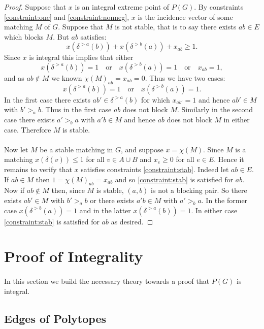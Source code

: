 \begin{proof}
Suppose that $x$ is an integral extreme point of $P(G)$. By constraints \ref{constraint:one} and \ref{constraint:nonneg}, $x$ is the incidence vector of some matching $M$ of $G$. Suppose that $M$ is not stable, that is to say there exists $ab \in E$ which blocks $M$. But $ab$ satisfies:
$$x(\delta^{>a}(b)) + x(\delta^{>b}(a)) + x_{ab} \geq 1.$$
Since $x$ is integral this implies that either
$$x(\delta^{>a}(b)) = 1 \quad\text{or}\quad  x(\delta^{>b}(a)) = 1 \quad\text{or}\quad x_{ab}=1,$$
and as $ab \not\in M$ we known $\chi(M)_{ab} = x_{ab}=0$. Thus we have two cases:
$$x(\delta^{>a}(b)) = 1 \quad\text{or}\quad  x(\delta^{>b}(a)) = 1.$$
In the first case there exists $ab' \in \delta^{>a}(b)$ for which $x_{ab'} = 1$ and hence $ab' \in M$  with $b' >_a b$. Thus in the first case $ab$ does not block $M$. Similarly in the second case there exists $a' >_b a$ with $a'b \in M$ and hence $ab$ does not block $M$ in either case. Therefore $M$ is stable.
\paragraph{}
Now let $M$ be a stable matching in $G$, and suppose  $x = \chi(M)$. Since $M$ is a matching $x(\delta(v)) \leq 1$ for all $v \in A \cup B$ and $x_e \geq 0$ for all $e \in E$. Hence it remains to verify that $x$ satisfies constraints \ref{constraint:stab}. Indeed let $ab \in E$. If $ab \in M$ then $1 = \chi(M)_{ab} = x_{ab}$ and so \ref{constraint:stab} is satisfied for $ab$. Now if $ab \not\in M$ then, since $M$ is stable, $(a,b)$ is not a blocking pair. So there exists $ab' \in M$ with $b' >_a b$ or there exists $a'b \in M$ with $a' >_b a$. In the former case $x(\delta^{>b}(a)) = 1$ and in the latter $x(\delta^{>a}(b)) = 1$. In either case \ref{constraint:stab} is satisfied for $ab$ as desired.  
\end{proof}
\section{Proof of Integrality}
\paragraph{}
In this section we build the necessary theory towards a proof that $P(G)$ is integral.
\subsection{Edges of Polytopes}
